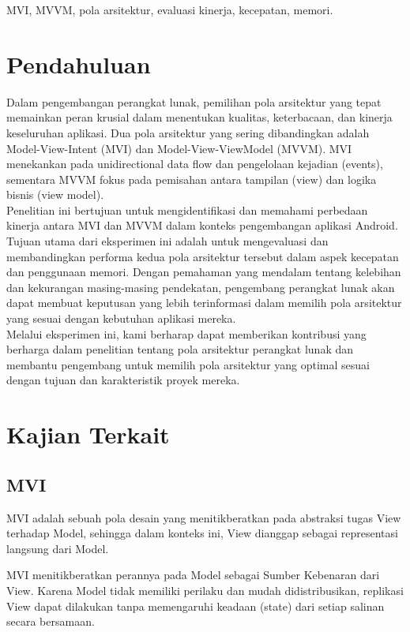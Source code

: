 \documentclass[conference]{IEEEtran}
\begin{document}
\begin{IEEEkeywords}
MVI, MVVM, pola arsitektur, evaluasi kinerja, kecepatan, memori.
\end{IEEEkeywords}

\section{Pendahuluan}
Dalam pengembangan perangkat lunak, pemilihan pola arsitektur yang tepat memainkan peran krusial dalam menentukan kualitas, keterbacaan, dan kinerja keseluruhan aplikasi. Dua pola arsitektur yang sering dibandingkan adalah Model-View-Intent (MVI) dan Model-View-ViewModel (MVVM). MVI menekankan pada unidirectional data flow dan pengelolaan kejadian (events), sementara MVVM fokus pada pemisahan antara tampilan (view) dan 
logika bisnis (view model). \\
\indent Penelitian ini bertujuan untuk mengidentifikasi dan memahami perbedaan kinerja antara MVI dan MVVM dalam konteks pengembangan aplikasi Android. Tujuan utama dari eksperimen ini adalah untuk mengevaluasi dan membandingkan performa kedua pola arsitektur tersebut dalam aspek kecepatan dan penggunaan memori. Dengan pemahaman yang mendalam tentang kelebihan dan kekurangan masing-masing pendekatan, pengembang perangkat lunak akan dapat membuat keputusan yang lebih terinformasi dalam memilih pola arsitektur yang sesuai dengan kebutuhan aplikasi mereka. \\
\indent Melalui eksperimen ini, kami berharap dapat memberikan kontribusi yang berharga dalam penelitian tentang pola arsitektur perangkat lunak dan membantu pengembang untuk memilih pola arsitektur yang optimal sesuai dengan tujuan dan karakteristik proyek mereka.


\section{Kajian Terkait}

\subsection{MVI}
\indent MVI adalah sebuah pola desain yang menitikberatkan pada abstraksi tugas View terhadap Model, sehingga dalam konteks ini, View dianggap sebagai representasi langsung dari Model.

\indent MVI menitikberatkan perannya pada Model sebagai Sumber Kebenaran dari View. Karena Model tidak memiliki perilaku dan mudah didistribusikan\cite{anhar2024analisis}, replikasi View dapat dilakukan tanpa memengaruhi keadaan (state) dari setiap salinan secara bersamaan.
\end{document}
